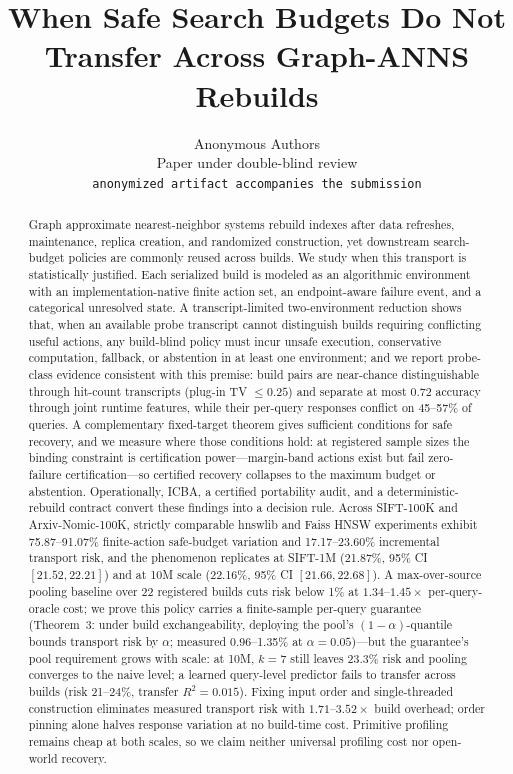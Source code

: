 \documentclass{article}
\title{When Safe Search Budgets Do Not Transfer Across Graph-ANNS Rebuilds}
\author{Anonymous Authors\\
Paper under double-blind review\\
\texttt{anonymized artifact accompanies the submission}}
\begin{document}
\maketitle

\begin{abstract}
Graph approximate nearest-neighbor systems rebuild indexes after data refreshes, maintenance, replica
creation, and randomized construction, yet downstream search-budget policies are commonly reused across
builds. We study when this transport is statistically justified. Each serialized build is modeled as an
algorithmic environment with an implementation-native finite action set, an endpoint-aware failure event,
and a categorical unresolved state. A transcript-limited two-environment reduction shows that, when an
available probe transcript cannot distinguish builds requiring conflicting useful actions, any build-blind
policy must incur unsafe execution, conservative computation, fallback, or abstention in at least one
environment; and we report probe-class evidence consistent with this premise: build pairs are
near-chance distinguishable through hit-count transcripts (plug-in TV $\le0.25$) and separate at most
$0.72$ accuracy through joint runtime features, while their per-query responses conflict on 45--57\% of
queries. A complementary fixed-target theorem gives sufficient conditions for safe recovery, and
we measure where those conditions hold: at registered sample sizes the binding constraint is
certification power---margin-band actions exist but fail zero-failure certification---so certified recovery
collapses to the maximum budget or abstention. Operationally, ICBA, a
certified portability audit, and a deterministic-rebuild contract convert these findings into a decision
rule. Across SIFT-100K and Arxiv-Nomic-100K, strictly comparable hnswlib and Faiss HNSW experiments exhibit
75.87--91.07\% finite-action safe-budget variation and 17.17--23.60\% incremental transport risk, and the
phenomenon replicates at SIFT-1M (21.87\%, 95\% CI $[21.52, 22.21]$) and at 10M scale
(22.16\%, 95\% CI $[21.66, 22.68]$). A max-over-source pooling baseline over
22 registered builds cuts risk below 1\% at $1.34$--$1.45\times$ per-query-oracle cost; we prove this
policy carries a finite-sample per-query guarantee (Theorem~3: under build exchangeability, deploying the
pool's $(1{-}\alpha)$-quantile bounds transport risk by $\alpha$; measured 0.96--1.35\% at
$\alpha{=}0.05$)---but the guarantee's pool requirement grows with scale: at 10M, $k{=}7$ still leaves
23.3\% risk and pooling converges to the naive level; a learned query-level predictor fails to
transfer across builds (risk 21--24\%, transfer $R^2 = 0.015$). Fixing input order and single-threaded construction eliminates measured transport
risk with $1.71$--$3.52\times$ build overhead; order pinning alone halves response variation at no build-time
cost. Primitive profiling remains cheap at both scales, so we claim neither universal profiling cost nor
open-world recovery.
\end{abstract}
\end{document}
